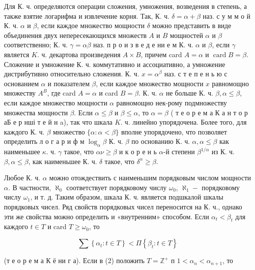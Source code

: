 \documentclass[10pt]{article}
\begin{document}
Для К. ч. определяются операции сложения, умножения, возведения в степень, а также взятие логарифма и извлечение корня. Так, К. ч. $\delta=\alpha+\beta$ наз. с у м м о й К. ч. $\alpha$ и $\beta$, если каждое множество мощности $\delta$ можно представить в виде объединения двух непересекающихся множеств $A$ и $B$ мощностей $\alpha$ и $\beta$ соответственно; К. ч. $\gamma=\alpha \beta$ наз. п р о и з в е д е ни е м К. ч. $\alpha$ и $\beta$, если $\gamma$ является $K$. ч. декартова произведения $A \times B$, причем card $A=\alpha$ и $\operatorname{card} B=\beta$. Сложение и умножение К. ч. коммутативно и ассоциативно, а умножение дистрибутивно относительно сложения. К. ч. $x=\alpha^{\beta}$ наз. с т е п е н ь ю с основанием $\alpha$ и показателем $\beta$, если каждое множество мощности $x$ равномощно множеству $A^{B}$, где card $A=\alpha$ и card $B=\beta$. К. ч. $\alpha$ не больше К. ч. $\beta, \alpha \leqslant \beta$, если каждое множество мощности $\alpha$ равномощно нек-рому подмножеству множества мощности $\beta$. Если $\alpha \leqslant \beta$ и $\beta \leqslant \alpha$, то $\alpha=\beta$ ( т е о р е м а $К$ а н т о р аБ е р нші т е й н a), так что шкала $K$. ч. линейно упорядочена. Более того, для каждого $К$. ч. $\beta$ множество $\{\alpha: \alpha<\beta\}$ вполне упорядочено, что позволяет определить л о г а р и ф м $\log _{\alpha} \beta$ К. ч. $\beta$ по основанию К. ч. $\alpha, \alpha \leqslant \beta$ как наименьшее $\kappa$. ч. $\gamma$ такое, что $\alpha \nu \geqslant \beta$ и к о р е н ь $\alpha$-й степени $\beta^{1 / \alpha}$ из К. ч. $\beta, \alpha \leqslant \beta$, как наименьшее К. ч. $\delta$ такое, что $\delta^{\alpha} \geqslant \beta$.



Любое К. ч. $\alpha$ можно отождествить с наименьшим порядковым числом мощности $\alpha$. В частности, $\aleph_{0}$ соответствует порядковому числу $\omega_{0}$, $\aleph_{1}-$ порядковому числу $\omega_{1}$, и т. д. Таким образом, шкала К. ч. является подшкалой шкалы порядковых чисел. Ряд свойств порядковых чисел переносится на К. ч., однако эти же свойства можно определить и «внутренним» способом. Если $\alpha_{t}<\beta_{t}$ для каждого $t \in T$ и card $T \geqslant \omega_{0}$, то



\[

\sum\left\{\alpha_{t}: t \in T\right\}<\Pi\left\{\beta_{t}: t \in T\right\}

\]



(т е о р е м а $К$ ё ни г а). Если в (2) положить $T=\mathbb{Z}^{+}$ п $1<\alpha_{n}<\alpha_{n+1}$, то
\end{document}
